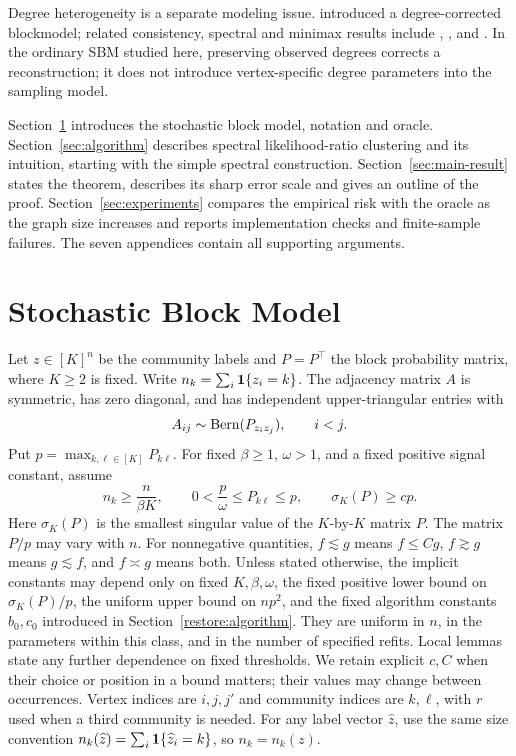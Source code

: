 Degree heterogeneity is a separate modeling issue. \citet{karrer2011} introduced a degree-corrected blockmodel;
related consistency, spectral and minimax results include
\citet{zhao2012}, \citet{jin2015}, and
\citet{gmzz2018}. In the ordinary SBM studied
here, preserving observed degrees corrects a reconstruction; it does
not introduce vertex-specific degree parameters into the sampling model.

Section~\ref{sec:statements} introduces the stochastic block model,
notation and oracle. Section~\ref{sec:algorithm} describes spectral likelihood-ratio clustering
and its intuition, starting with the simple spectral construction.
Section~\ref{sec:main-result} states the theorem, describes its sharp
error scale and gives an outline of the proof. Section~\ref{sec:experiments}
compares the empirical risk with the oracle as the graph size increases
and reports implementation checks and finite-sample failures. The seven
appendices contain all supporting arguments.

\section{Stochastic Block Model}\label{sec:statements}

Let $z\in[K]^n$ be the community labels and $P=P^\top$ the block
probability matrix, where $K\ge2$ is fixed. Write
$n_k=\sum_i\mathbf1\{z_i=k\}$. The adjacency matrix $A$ is symmetric, has
zero diagonal, and has independent upper-triangular entries with
\begin{equation}\label{eq:mean-model}
 A_{ij}\sim\operatorname{Bern}(P_{z_i z_j}),\qquad i<j.
\end{equation}
Put $p=\max_{k,\ell\in[K]}P_{k\ell}$. For fixed $\beta\ge1$,
$\omega>1$, and a fixed positive signal constant, assume
\begin{equation}\label{eq:structural}
 n_k\ge\frac{n}{\beta K},\qquad
 0<\frac{p}{\omega}\le P_{k\ell}\le p,\qquad
 \sigma_K(P)\ge c p.
\end{equation}
Here $\sigma_K(P)$ is the smallest singular value of the $K$-by-$K$
matrix $P$. The matrix $P/p$ may vary with $n$. For nonnegative
quantities, $f\lesssim g$ means $f\le Cg$, $f\gtrsim g$ means
$g\lesssim f$, and $f\asymp g$ means both. Unless stated otherwise,
the implicit constants may depend only on fixed $K,\beta,\omega$,
the fixed positive lower bound on $\sigma_K(P)/p$, the uniform upper
bound on $np^2$, and the fixed algorithm constants $b_0,c_0$ introduced
in Section~\ref{restore:algorithm}. They are uniform in $n$, in the
parameters within this class, and in the number of specified refits.
Local lemmas state any further dependence on fixed thresholds.
We retain explicit $c,C$ when their choice or position in a bound
matters; their values may change between occurrences. Vertex indices
are $i,j,j'$ and community indices are $k,\ell$, with $r$ used
when a third community is needed.
For any label vector $\widehat z$, use the same size convention
$n_k(\widehat z)=\sum_i\mathbf1\{\widehat z_i=k\}$, so $n_k=n_k(z)$.

